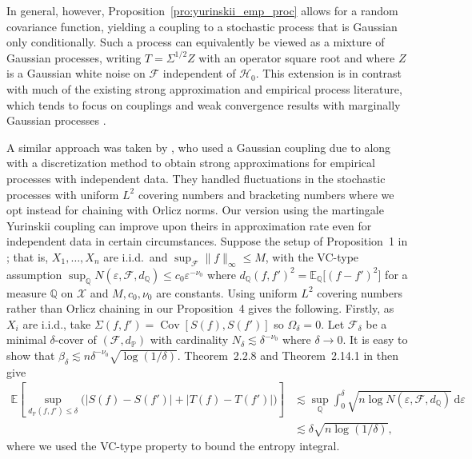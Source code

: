 \documentclass[11pt,lof]{puthesis}
\renewcommand{\P}{\ensuremath{\mathbb{P}}}
\newcommand{\E}{\ensuremath{\mathbb{E}}}
\newcommand{\Q}{\ensuremath{\mathbb{Q}}}
\newcommand{\cH}{\ensuremath{\mathcal{H}}}
\newcommand{\cF}{\ensuremath{\mathcal{F}}}
\newcommand{\cX}{\ensuremath{\mathcal{X}}}
\DeclareMathOperator{\Cov}{Cov}
\newcommand{\diff}[1]{\,\mathrm{d}#1}
\theoremstyle{break}
\theoremstyle{proof}
\begin{document}
In general, however, Proposition~\ref{pro:yurinskii_emp_proc} allows for a
random
covariance function, yielding a coupling to a stochastic process that is
Gaussian only conditionally. Such a process can equivalently be viewed as a
mixture of Gaussian processes, writing $T=\Sigma^{1/2} Z$ with an operator
square root and where $Z$ is a Gaussian white noise on $\cF$ independent of
$\cH_0$. This extension is in contrast with much of the existing strong
approximation and empirical process literature, which tends to focus on
couplings and weak convergence results with marginally Gaussian processes
\citep{settati2009gaussian,chernozhukov2016empirical}.

A similar approach was taken by \citet{berthet2006revisiting}, who used a
Gaussian coupling due to \citet{zaitsev1987estimates,zaitsev1987gaussian} along
with a discretization method to obtain strong approximations for empirical
processes with independent data. They handled fluctuations in the stochastic
processes with uniform $L^2$ covering numbers and bracketing numbers where we
opt instead for chaining with Orlicz norms. Our version using the martingale
Yurinskii coupling can improve upon theirs in approximation rate even for
independent data in certain circumstances. Suppose the setup of
Proposition~1 in \citet{berthet2006revisiting}; that is, $X_1, \ldots, X_n$ are
i.i.d.\ and $\sup_{\cF} \|f\|_\infty \leq M$, with the VC-type assumption
$\sup_\Q N(\varepsilon, \cF, d_\Q) \leq c_0 \varepsilon^{-\nu_0}$ where
$d_\Q(f,f')^2 = \E_\Q\big[(f-f')^2\big]$ for a measure $\Q$ on $\cX$ and
$M, c_0, \nu_0$ are constants. Using uniform $L^2$ covering numbers
rather than Orlicz chaining in our Proposition~4 gives the following.
Firstly, as $X_i$ are i.i.d., take $\Sigma(f, f') = \Cov[S(f), S(f')]$ so
$\Omega_\delta = 0$. Let $\cF_\delta$ be a minimal $\delta$-cover of
$(\cF, d_\P)$ with cardinality $N_\delta \lesssim \delta^{-\nu_0}$ where
$\delta \to 0$. It is easy to show that
$\beta_\delta \lesssim n \delta^{-\nu_0} \sqrt{\log(1/\delta)}$.
Theorem~2.2.8 and Theorem~2.14.1 in \citet{van1996weak} then give
%
\begin{align*}
  \E\left[
    \sup_{d_\P(f,f') \leq \delta}
    \Big(
      |S(f) - S(f')|
      + |T(f) - T(f')|
    \Big)
  \right]
  &\lesssim
  \sup_\Q
  \int_0^\delta
  \sqrt{n \log N(\varepsilon, \cF, d_\Q)}
  \diff{\varepsilon} \\
  &\lesssim
  \delta \sqrt{n\log(1/\delta)},
\end{align*}
%
where we used the VC-type property to bound the entropy integral.
\end{document}
